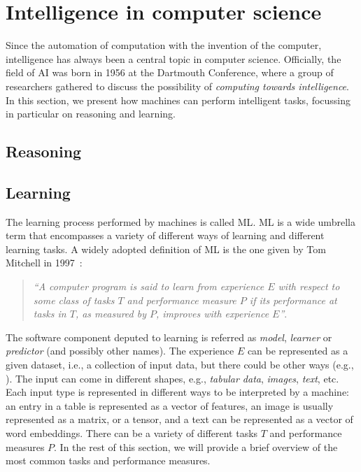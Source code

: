 \section{Intelligence in computer science}\label{sec:intelligence-in-computer-science}

Since the automation of computation with the invention of the computer, intelligence has always been a central topic in computer science.
%
Officially, the field of \gls{AI} was born in 1956 at the Dartmouth Conference, where a group of researchers gathered to discuss the possibility of \emph{computing towards intelligence}.
%
In this section, we present how machines can perform intelligent tasks, focussing in particular on reasoning and learning.

\subsection{Reasoning}\label{subsec:reasoning}
%

\subsection{Learning}\label{subsec:machine-learning}
%
The learning process performed by machines is called \gls{ML}.
%
\gls{ML} is a wide umbrella term that encompasses a variety of different ways of learning and different learning tasks.
%
A widely adopted definition of \gls{ML} is the one given by Tom Mitchell in 1997~\cite{DBLP:books/daglib/0087929}:
%
\begin{quote}
    \emph{``A computer program is said to learn from experience $E$ with respect to some class of tasks $T$ and performance measure $P$ if its performance at tasks in $T$, as measured by $P$, improves with experience $E$''}.
\end{quote}
%
The software component deputed to learning is referred as \emph{model}, \emph{learner} or \emph{predictor} (and possibly other names).
%
The experience $E$ can be represented as a given dataset, i.e., a collection of input data, but there could be other ways (e.g., ).
%
The input can come in different shapes, e.g., \emph{tabular data}, \emph{images}, \emph{text}, etc.
%
Each input type is represented in different ways to be interpreted by a machine: an entry in a table is represented as a vector of features, an image is usually represented as a matrix, or a tensor, and a text can be represented as a vector of word embeddings.
%
There can be a variety of different tasks $T$ and performance measures $P$.
%
In the rest of this section, we will provide a brief overview of the most common tasks and performance measures.


